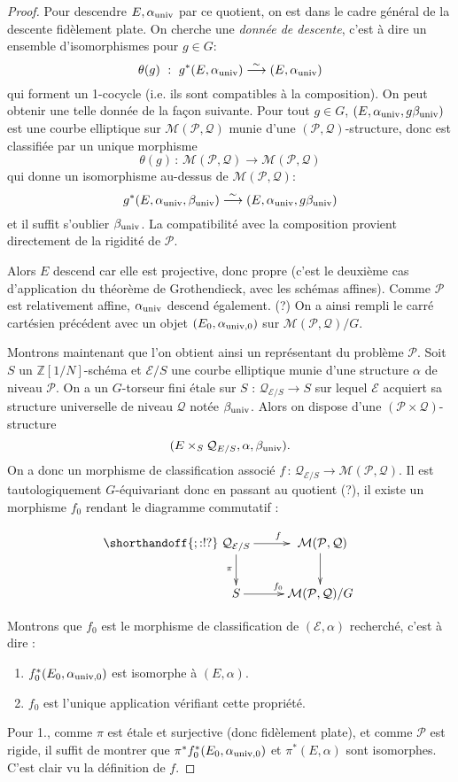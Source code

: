 \documentclass[11pt,a4paper]{article}
\newcommand{\Z}{\mathbb{Z}}
\newcommand{\E}{\mathcal{E}}
\renewcommand{\Pr}{\mathcal{P}}
\newcommand{\Qr}{\mathcal{Q}}
\newcommand{\M}{\mathcal{M}}
\newcommand{\vers}{\longrightarrow}
\newcommand{\de}{\,:\,}
\theoremstyle{definition}
\begin{document}
\begin{proof}
Pour descendre $E, \alpha_{\mathrm{univ}}$ par ce quotient, on est dans le cadre général de la descente fidèlement plate. On cherche une \emph{donnée de descente}, c'est à dire un ensemble d'isomorphismes pour $g\in G$:
$$\theta(g)\ :\ g^*(E, \alpha_{\univ}) \overset{\sim}{\vers} (E, \alpha_{\univ})$$
qui forment un 1-cocycle (i.e. ils sont compatibles à la composition). On peut obtenir une telle donnée de la façon suivante. Pour tout $g\in G$, $(E, \alpha_{\mathrm{univ}}, g\beta_{\mathrm{univ}})$ est une courbe elliptique sur $\M(\Pr, \Qr)$ munie d'une $(\Pr,\Qr)$-structure, donc est classifiée par un unique morphisme
$$\theta(g) \de \M(\Pr,\Qr)\vers \M(\Pr,\Qr)$$
qui donne un isomorphisme au-dessus de $\M(\Pr,\Qr)$:
$$g^*(E, \alpha_\univ, \beta_\univ) \overset{\sim}{\vers} (E, \alpha_\univ, g\beta_\univ)$$
et il suffit s'oublier $\beta_{\mathrm{univ}}$. La compatibilité avec la composition provient directement de la rigidité de $\Pr$.

Alors $E$ descend car elle est projective, donc propre (c'est le deuxième cas d'application du théorème de Grothendieck, avec les schémas affines). Comme $\Pr$ est relativement affine, $\alpha_{\mathrm{univ}}$ descend également. (?) On a ainsi rempli le carré cartésien précédent avec un objet $(E_0,\alpha_{\mathrm{univ}, 0})$ sur $\M(\Pr,\Qr)/G$.

Montrons maintenant que l'on obtient ainsi un représentant du problème $\Pr$. Soit $S$ un $\Z[1/N]$-schéma et $\E/S$ une courbe elliptique munie d'une structure $\alpha$ de niveau $\Pr$. On a un $G$-torseur fini étale sur $S$ : $\Qr_{\E/S}\vers S$ sur lequel $\E$ acquiert sa structure universelle de niveau $\Qr$ notée $\beta_{\mathrm{univ}}$. Alors on dispose d'une $(\Pr\times\Qr)$-structure
$$(E\times_S \Qr_{E/S}, \alpha, \beta_\univ).$$
On a donc un morphisme de classification associé $f \de \Qr_{\E/S}\vers \M(\Pr,\Qr)$. Il est tautologiquement $G$-équivariant donc en passant au quotient (?), il existe un morphisme $f_0$ rendant le diagramme commutatif :

$$
\shorthandoff{;:!?}
\xymatrix {
\Qr_{\E/S} \ar[d]_\pi \ar[r]^f &\ \M(\Pr,\Qr) \ar[d] \\
 S \ar[r]^{f_0} & \M(\Pr,\Qr)/G
}
$$

Montrons que $f_0$ est le morphisme de classification de $(\E, \alpha)$ recherché, c'est  à dire :
\begin{enumerate}
\item $f_0^*(E_0, \alpha_{\mathrm{univ}, 0})$ est isomorphe à $(E, \alpha)$.
\item $f_0$ est l'unique application vérifiant cette propriété.
\end{enumerate}
Pour 1., comme $\pi$ est étale et surjective (donc fidèlement plate), et comme $\Pr$ est rigide, il suffit de montrer que $\pi^*f_0^*(E_0, \alpha_{\mathrm{univ}, 0})$ et $\pi^*(E,\alpha)$ sont isomorphes. C'est clair vu la définition de $f$.


\end{proof}
\end{document}
